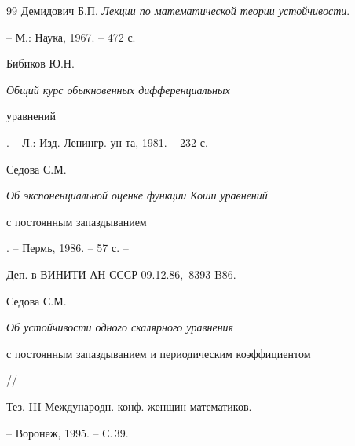 \begin{thebibliography}{99}
Демидович Б.П. {\em Лекции по математической теории устойчивости}.


-- М.: Наука, 1967. -- 472 с.







Бибиков Ю.Н. {\em Общий курс обыкновенных дифференциальных


уравнений}. -- Л.: Изд. Ленингр. ун-та, 1981. -- 232 с.







Седова С.М. {\em Об экспоненциальной оценке функции Коши уравнений


с постоянным запаздыванием}. -- Пермь, 1986. -- 57 с. --


Деп. в ВИНИТИ АН СССР 09.12.86, \No\,8393-B86.







Седова С.М. {\em Об устойчивости одного скалярного уравнения


с постоянным запаздыванием и периодическим коэффициентом} //


Тез. III Международн. конф. жен\-щин-ма\-те\-ма\-ти\-ков.


-- Воронеж, 1995. -- С.\,39.





\end{thebibliography} 


 


\vskip 2cm 


 






 


 


